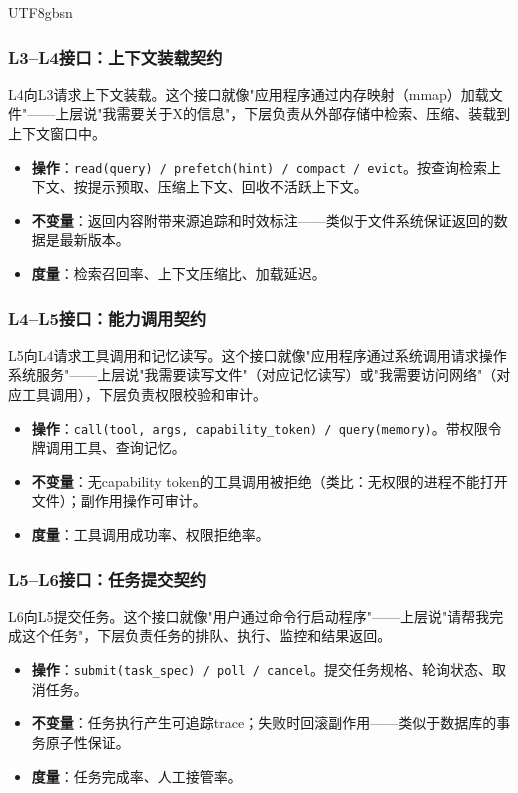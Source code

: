 \documentclass[11pt,a4paper]{article}
\begin{document}
\begin{CJK*}{UTF8}{gbsn}
\subsubsection{L3--L4接口：上下文装载契约}

L4向L3请求上下文装载。这个接口就像"应用程序通过内存映射（mmap）加载文件"——上层说"我需要关于X的信息"，下层负责从外部存储中检索、压缩、装载到上下文窗口中。

\begin{itemize}[nosep]
\item \textbf{操作}：\texttt{read(query) / prefetch(hint) / compact / evict}。按查询检索上下文、按提示预取、压缩上下文、回收不活跃上下文。
\item \textbf{不变量}：返回内容附带来源追踪和时效标注——类似于文件系统保证返回的数据是最新版本。
\item \textbf{度量}：检索召回率、上下文压缩比、加载延迟。
\end{itemize}

\subsubsection{L4--L5接口：能力调用契约}

L5向L4请求工具调用和记忆读写。这个接口就像"应用程序通过系统调用请求操作系统服务"——上层说"我需要读写文件"（对应记忆读写）或"我需要访问网络"（对应工具调用），下层负责权限校验和审计。

\begin{itemize}[nosep]
\item \textbf{操作}：\texttt{call(tool, args, capability\_token) / query(memory)}。带权限令牌调用工具、查询记忆。
\item \textbf{不变量}：无capability token的工具调用被拒绝（类比：无权限的进程不能打开文件）；副作用操作可审计\cite{debenedetti2025camel}。
\item \textbf{度量}：工具调用成功率、权限拒绝率。
\end{itemize}

\subsubsection{L5--L6接口：任务提交契约}

L6向L5提交任务。这个接口就像"用户通过命令行启动程序"——上层说"请帮我完成这个任务"，下层负责任务的排队、执行、监控和结果返回。

\begin{itemize}[nosep]
\item \textbf{操作}：\texttt{submit(task\_spec) / poll / cancel}。提交任务规格、轮询状态、取消任务。
\item \textbf{不变量}：任务执行产生可追踪trace；失败时回滚副作用——类似于数据库的事务原子性保证。
\item \textbf{度量}：任务完成率、人工接管率。
\end{itemize}


\end{CJK*}
\end{document}
